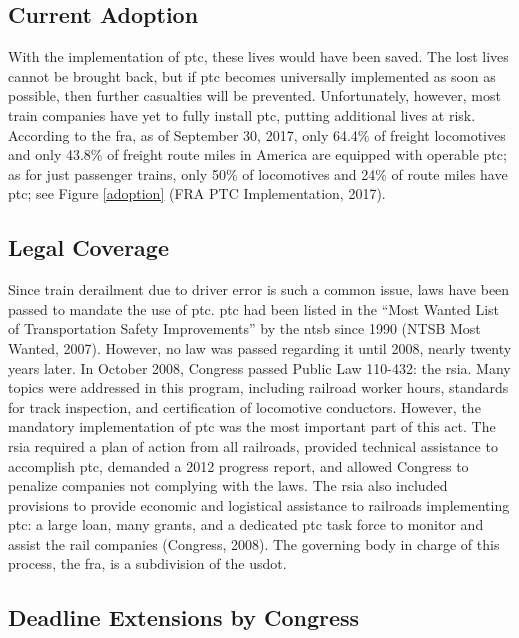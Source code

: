 \documentclass[11pt, titlepage]{article}
\begin{document}
\subsection{Current Adoption}

With the implementation of \gls{ptc}, these lives would have been saved. The lost
lives cannot be brought back, but if \gls{ptc} becomes universally implemented as
soon as possible, then further casualties will be prevented. Unfortunately,
however, most train companies have yet to fully install \gls{ptc}, putting
additional lives at risk. According to the \gls{fra}, as of September 30, 2017,
only 64.4\% of freight locomotives and only 43.8\% of freight route miles in
America are equipped with operable \gls{ptc}; as for just passenger trains, only
50\% of locomotives and 24\% of route miles have \gls{ptc}; see Figure
\ref{adoption} (FRA PTC Implementation, 2017).

\subsection{Legal Coverage}

Since train derailment due to driver error is such a common issue, laws have been
passed to mandate the use of \gls{ptc}. \gls{ptc} had been listed in the ``Most
Wanted List of Transportation Safety Improvements'' by the \gls{ntsb} since 1990
(NTSB Most Wanted, 2007). However, no law was passed
regarding it until 2008, nearly twenty years later. In October 2008, Congress
passed Public Law 110-432: the \gls{rsia}. Many topics were addressed in this
program, including railroad worker hours, standards for track inspection, and
certification of locomotive conductors. However, the mandatory implementation of
\gls{ptc} was the most important part of this act. The \gls{rsia} required a plan
of action from all railroads, provided technical assistance to accomplish
\gls{ptc}, demanded a 2012 progress report, and allowed Congress to penalize
companies not complying with the laws. The \gls{rsia} also included provisions to
provide economic and logistical assistance to railroads implementing \gls{ptc}: a
large loan, many grants, and a dedicated \gls{ptc} task force to monitor and
assist the rail companies (Congress, 2008). The governing body in charge of this
process, the \gls{fra}, is a subdivision of the \gls{usdot}.

\subsection{Deadline Extensions by Congress}
\end{document}
